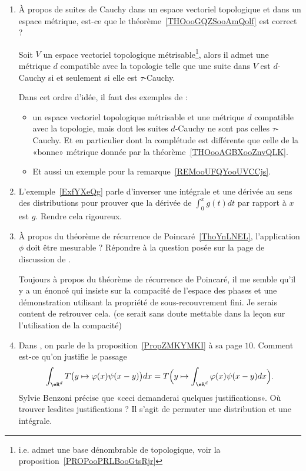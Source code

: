 \begin{enumerate}
    \item
        À propos de suites de Cauchy dans un espace vectoriel topologique et dans un espace métrique, est-ce que le théorème~\ref{THOooGQZSooAmQolf} est correct ?

        Soit \( V\) un espace vectoriel topologique métrisable\footnote{i.e. admet une base dénombrable de topologique, voir la proposition~\ref{PROPooPRLBooGtsRjr}}, alors il admet une métrique \( d\) compatible avec la topologie telle que une suite dans \( V\) est \( d\)-Cauchy si et seulement si elle est \( \tau\)-Cauchy.

        Dans cet ordre d'idée, il faut des exemples de :
        \begin{itemize}
            \item un espace vectoriel topologique métrisable et une métrique \( d\) compatible avec la topologie, mais dont les suites \( d\)-Cauchy ne sont pas celles \( \tau\)-Cauchy. Et en particulier dont la complétude est différente que celle de la «bonne» métrique donnée par la théorème~\ref{THOooAGBXooZnvQLK}.
            \item Et aussi un exemple pour la remarque~\ref{REMooUFQYooUVCCjs}.
        \end{itemize}
    \item
        L'exemple~\ref{ExfYXeQg} parle d'inverser une intégrale et une dérivée au sens des distributions pour prouver que la dérivée de \( \int_0^xg(t)dt\) par rapport à \( x\) est \( g\). Rendre cela rigoureux.
    \item
        À propos du théorème de récurrence de Poincaré~\ref{ThoYnLNEL}, l'application \( \phi\) doit être mesurable ? Répondre à la question posée sur la page de discussion de .

        Toujours à propos du théorème de récurrence de Poincaré, il me semble qu'il y a un énoncé qui insiste sur la compacité de l'espace des phases et une démonstration utilisant la propriété de sous-recouvrement fini. Je serais content de retrouver cela. (ce serait sans doute mettable dans la leçon sur l'utilisation de la compacité)
        \item
            Dans \cite{OEVAuEz}, on parle de la proposition~\ref{PropZMKYMKI} à sa page \( 10\). Comment est-ce qu'on justifie le passage
            \begin{equation}
                \int_{\eR^d}T\big( y\mapsto \varphi(x)\psi(x-y) \big)dx=T\Big( y\mapsto\int_{\eR^d}\varphi(x)\psi(x-y)dx \Big).
            \end{equation}
            Sylvie Benzoni précise que «ceci demanderai quelques justifications». Où trouver lesdites justifications ? Il s'agit de permuter une distribution et une intégrale.


\end{enumerate}
